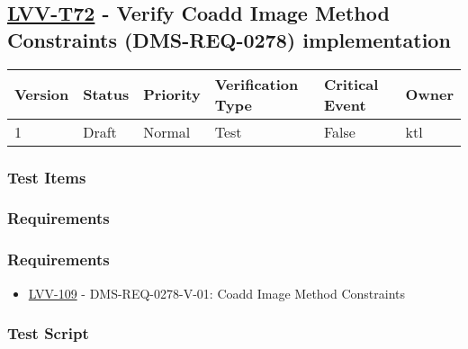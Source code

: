 \hypertarget{lvv-t72---verify-coadd-image-method-constraints-dms-req-0278-implementation}{%
\subsection{\texorpdfstring{\href{https://jira.lsstcorp.org/secure/Tests.jspa\#/testCase/LVV-T72}{LVV-T72}
- Verify Coadd Image Method Constraints (DMS-REQ-0278)
implementation}{LVV-T72 - Verify Coadd Image Method Constraints (DMS-REQ-0278) implementation}}\label{lvv-t72---verify-coadd-image-method-constraints-dms-req-0278-implementation}}

\begin{longtable}[]{@{}llllll@{}}
\toprule
Version & Status & Priority & Verification Type & Critical Event &
Owner\tabularnewline
\midrule
\endhead
1 & Draft & Normal & Test & False & ktl\tabularnewline
\bottomrule
\end{longtable}

\hypertarget{test-items-6}{%
\subsubsection{Test Items}\label{test-items-6}}

\hypertarget{requirements-12}{%
\subsubsection{Requirements}\label{requirements-12}}

\hypertarget{requirements-13}{%
\subsubsection{Requirements}\label{requirements-13}}

\begin{itemize}
\tightlist
\item
  \href{https://jira.lsstcorp.org/browse/LVV-109}{LVV-109} -
  DMS-REQ-0278-V-01: Coadd Image Method Constraints
\end{itemize}

\hypertarget{test-script-6}{%
\subsubsection{Test Script}\label{test-script-6}}


